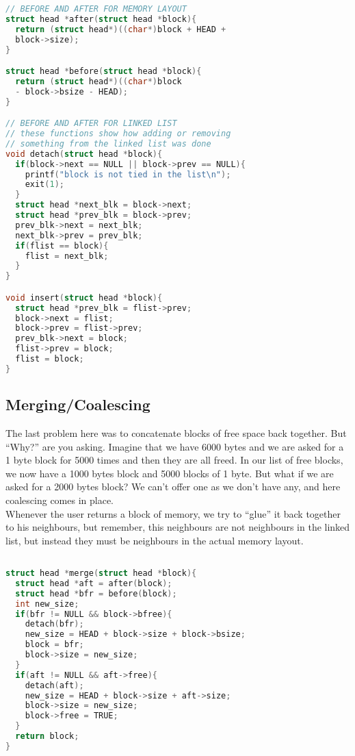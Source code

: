\documentclass[a4paper,10pt]{article}
\begin{document}
\begin{lstlisting}[language=C]
// BEFORE AND AFTER FOR MEMORY LAYOUT
struct head *after(struct head *block){
  return (struct head*)((char*)block + HEAD +
  block->size);
}

struct head *before(struct head *block){
  return (struct head*)((char*)block
  - block->bsize - HEAD);
}

// BEFORE AND AFTER FOR LINKED LIST
// these functions show how adding or removing
// something from the linked list was done
void detach(struct head *block){
  if(block->next == NULL || block->prev == NULL){
    printf("block is not tied in the list\n");
    exit(1);
  }
  struct head *next_blk = block->next;
  struct head *prev_blk = block->prev;
  prev_blk->next = next_blk;
  next_blk->prev = prev_blk;
  if(flist == block){
    flist = next_blk;
  }
}

void insert(struct head *block){
  struct head *prev_blk = flist->prev;
  block->next = flist;
  block->prev = flist->prev;
  prev_blk->next = block;
  flist->prev = block;
  flist = block;
}
\end{lstlisting}
\vspace{5mm}
\subsection*{Merging/Coalescing}
The last problem here was to concatenate blocks of free space back together. But ``Why?'' are you asking. Imagine that we have 6000 bytes and we are asked for a 1 byte block for 5000 times and then they are all freed. In our list of free blocks, we now have a 1000 bytes block and 5000 blocks of 1 byte. But what if we are asked for a 2000 bytes block? We can't offer one as we don't have any, and here coalescing comes in place. \\
\vspace{5mm}
Whenever the user returns a block of memory, we try to ``glue'' it back together to his neighbours, but remember, this neighbours are not neighbours in the linked list, but instead they must be neighbours in the actual memory layout.

\begin{lstlisting}[language=C]

struct head *merge(struct head *block){
  struct head *aft = after(block);
  struct head *bfr = before(block);
  int new_size;
  if(bfr != NULL && block->bfree){
    detach(bfr);
    new_size = HEAD + block->size + block->bsize;
    block = bfr;
    block->size = new_size;
  }
  if(aft != NULL && aft->free){
    detach(aft);
    new_size = HEAD + block->size + aft->size;
    block->size = new_size;
    block->free = TRUE;
  }
  return block;
}
\end{lstlisting}
\vspace{5mm}
\end{document}
